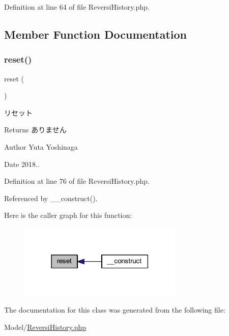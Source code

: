 Definition at line 64 of file Reversi\+History.\+php.



\subsection{Member Function Documentation}
\mbox{\label{class_reversi_history_a4a20559544fdf4dcb457e258dc976cf8}} 
\subsubsection{\texorpdfstring{reset()}{reset()}}
{\footnotesize\ttfamily reset (\begin{DoxyParamCaption}{ }\end{DoxyParamCaption})}



リセット 

\begin{DoxyReturn}{Returns}
ありません 
\end{DoxyReturn}
\begin{DoxyAuthor}{Author}
Yuta Yoshinaga 
\end{DoxyAuthor}
\begin{DoxyDate}{Date}
2018.. 
\end{DoxyDate}


Definition at line 76 of file Reversi\+History.\+php.



Referenced by \+\_\+\+\_\+construct().

Here is the caller graph for this function\+:\nopagebreak
\begin{figure}[H]
\begin{center}
\leavevmode
\includegraphics[width=222pt]{class_reversi_history_a4a20559544fdf4dcb457e258dc976cf8_icgraph}
\end{center}
\end{figure}


The documentation for this class was generated from the following file\+:\begin{DoxyCompactItemize}
\item 
Model/\hyperlink{_reversi_history_8php}{Reversi\+History.\+php}\end{DoxyCompactItemize}
